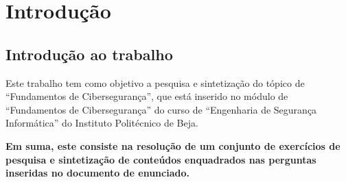 \chapter{Introdução}

\section{Introdução ao trabalho}

Este trabalho tem como objetivo a pesquisa e sintetização do tópico de ``Fundamentos de Cibersegurança'', que está inserido no módulo de ``Fundamentos de Cibersegurança'' do curso de ``Engenharia de Segurança Informática'' do Instituto Politécnico de Beja.

\textbf{Em suma, este consiste na resolução de um conjunto de exercícios de pesquisa e sintetização de conteúdos enquadrados nas perguntas inseridas no documento de enunciado.}

\newpage
